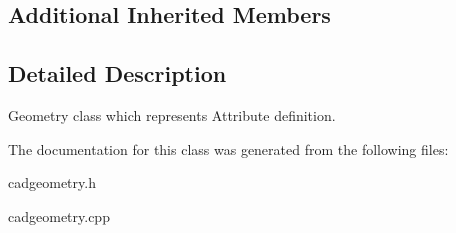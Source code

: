 \subsection*{Additional Inherited Members}


\subsection{Detailed Description}
Geometry class which represents Attribute definition. 

The documentation for this class was generated from the following files\+:\begin{DoxyCompactItemize}
\item 
cadgeometry.\+h\item 
cadgeometry.\+cpp\end{DoxyCompactItemize}
